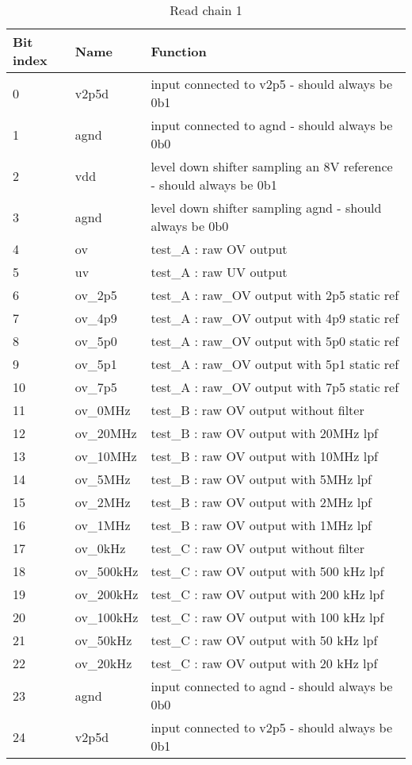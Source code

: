 \begin{table}[!htbp]
\centering
\begin{tabular}{@{}lll@{}}
\toprule
Bit index	& Name    & Function                                          \\ \toprule
0	        & v2p5d	  & input connected to v2p5 - should always be 0b1 \\
1         &	agnd    &	input connected to agnd - should always be 0b0 \\
2         &	vdd     &	level down shifter sampling an 8V reference - should always be 0b1 \\
3         &	agnd    &	level down shifter sampling agnd - should always be 0b0 \\
4         &	ov      &	test_A : raw OV output \\
5         &	uv      &	test_A : raw UV output \\
6         &	ov_2p5  & test_A : raw_OV output with 2p5 static ref \\
7         &	ov_4p9  &	test_A : raw_OV output with 4p9 static ref \\
8         &	ov_5p0	& test_A : raw_OV output with 5p0 static ref \\
9         &	ov_5p1  &	test_A : raw_OV output with 5p1 static ref \\
10        &	ov_7p5  &	test_A : raw_OV output with 7p5 static ref \\
11        &	ov_0MHz	& test_B : raw OV output without filter \\
12        &	ov_20MHz&	test_B : raw OV output with 20MHz lpf \\
13        &	ov_10MHz&	test_B : raw OV output with 10MHz lpf \\
14	      & ov_5MHz &	test_B : raw OV output with 5MHz lpf \\
15        &	ov_2MHz	& test_B : raw OV output with 2MHz lpf \\
16        &	ov_1MHz	& test_B : raw OV output with 1MHz lpf \\
17        &	ov_0kHz	& test_C : raw OV output without filter \\
18        &	ov_500kHz	& test_C : raw OV output with 500 kHz lpf \\
19        &	ov_200kHz	& test_C : raw OV output with 200 kHz lpf \\
20	      & ov_100kHz	& test_C : raw OV output with 100 kHz lpf \\
21	      & ov_50kHz	& test_C : raw OV output with 50 kHz lpf \\
22        &	ov_20kHz	& test_C : raw OV output with 20 kHz lpf \\
23	      & agnd	    & input connected to agnd - should always be 0b0 \\
24	      & v2p5d	    & input connected to v2p5 - should always be 0b1 \\
\bottomrule
\end{tabular}
\caption{Read chain 1}
\label{tab:read-chain-1}
\end{table}


